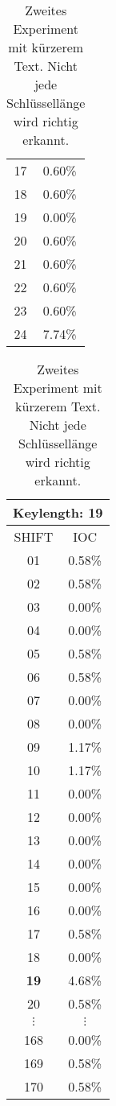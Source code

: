 \begin{table}[h]
\begin{subtable}[h]{0.25\textwidth}
\begin{tabular}{c|c}
            17&      0.60\%\\
            18&      0.60\%\\
            19&      0.00\%\\
            20&      0.60\%\\
            21&      0.60\%\\
            22&      0.60\%\\
            23&      0.60\%\\
            24&      7.74\%
        \end{tabular}
    \end{subtable}
    \hfill
    \begin{subtable}[h]{0.25\textwidth}
        \centering
        \begin{tabular}{c|c}
            \multicolumn{2}{l}{\textbf{Keylength: 19}}\\\hline
            SHIFT & IOC\\\hline
            01&      0.58\%\\
            02&      0.58\%\\
            03&      0.00\%\\
            04&      0.00\%\\
            05&      0.58\%\\
            06&      0.58\%\\
            07&      0.00\%\\
            08&      0.00\%\\
            09&      1.17\%\\
            10&      1.17\%\\
            11&      0.00\%\\
            12&      0.00\%\\
            13&      0.00\%\\
            14&      0.00\%\\
            15&      0.00\%\\
            16&      0.00\%\\
            17&      0.58\%\\
            18&      0.00\%\\
            \textbf{19}&      4.68\%\\
            20&      0.58\%\\
            $\vdots$ & $\vdots$\\
            168&     0.00\%\\
            169&     0.58\%\\
            170&     0.58\%
        \end{tabular}
    \end{subtable}
    \caption{Zweites Experiment mit kürzerem Text. Nicht jede Schlüssellänge wird richtig erkannt.}
    \label{tab:CC_result_2}
\end{table}
